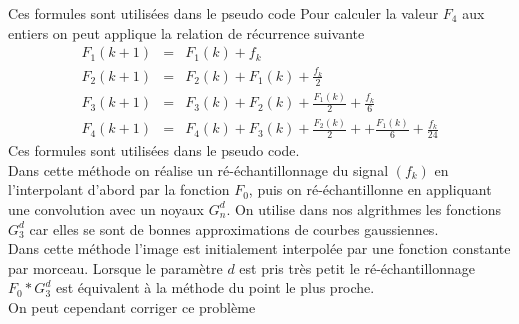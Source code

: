 Ces formules sont utilisées dans le pseudo code %
Pour calculer la valeur $F_4$ aux entiers on peut applique la relation de récurrence suivante
\begin{eqnarray*}
F_{1}(k+1)&=&  F_{1}(k)+f_{k}  \\
F_{2}(k+1)&=&  F_{2}(k)+F_{1}(k)+\frac{f_{k}}{2}   \\
F_{3}(k+1)&=&  F_{3}(k)+F_{2}(k)+\frac{F_{1}(k)}{2}+\frac{f_{k}}{6}   \\
F_{4}(k+1)&=&  F_{4}(k)+F_{3}(k)+\frac{F_{2}(k)}{2}++\frac{F_{1}(k)}{6}+\frac{f_{k}}{24}  
\end{eqnarray*}
Ces formules sont utilisées dans le pseudo code.\\ %
Dans cette méthode on réalise un ré-échantillonnage du signal $(f_k)$ en l'interpolant d'abord par la fonction $F_{0}$, puis on ré-échantillonne en appliquant une convolution avec un noyaux $G_n^d$. On utilise dans nos algrithmes les fonctions $G_3^d$ car elles se sont de bonnes approximations de courbes gaussiennes.\\ %
Dans cette méthode l'image est initialement interpolée par une fonction constante par morceau. Lorsque le paramètre $d$ est pris très petit le ré-échantillonnage $F_{0}*G_3^d$ est équivalent à la méthode du point le plus proche.\\
On peut cependant corriger ce problème


